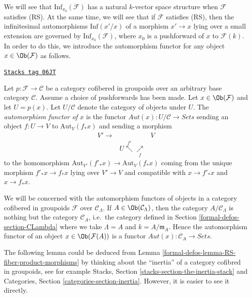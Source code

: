 We will see that $\text{Inf}_{x_0}(\mathcal{F})$ has a natural $k$-vector
space structure when $\mathcal{F}$ satisfies (RS). At the same time, we will
see that if $\mathcal{F}$ satisfies (RS), then the infinitesimal automorphisms
$\text{Inf}(x'/x)$ of a morphism $x' \to x$ lying over a small
extension are governed by $\text{Inf}_{x_0}(\mathcal{F})$, where $x_0$ is
a pushforward of $x$ to $\mathcal{F}(k)$. In order to do this, we introduce
the automorphism functor for any object $x \in \Ob(\mathcal{F})$ as
follows.

\begin{definition}
\label{formal-defos-definition-automorphism-functor}
\href{https://stacks.math.columbia.edu/tag/06JT}{\texttt{Stacks tag 06JT}}

Let $p : \mathcal{F} \to \mathcal{C}$ be a category cofibered in groupoids
over an arbitrary base category $\mathcal{C}$. Assume a choice of pushforwards
has been made. Let $x \in \Ob(\mathcal{F})$ and let $U = p(x)$.
Let $U/\mathcal{C}$ denote the category of objects under $U$. The
{\it automorphism functor of $x$} is the functor
$\mathit{Aut}(x) : U/\mathcal{C} \to \textit{Sets}$ sending an object
$f : U \to V$ to $\text{Aut}_V(f_*x)$ and sending a morphism
$$
\begin{array}{ccc}V' \longrightarrow &  & V \\  & U \overset{f'}{\nwarrow}\underset{f}{\nearrow} & \end{array}
$$
to the homomorphism
$\text{Aut}_{V'}(f'_*x) \to \text{Aut}_V(f_*x)$
coming from the unique morphism $f'_*x \to f_*x$ lying over
$V' \to V$ and compatible with $x \to f'_*x$ and $x \to f_*x$.
\end{definition}

We will be concerned with the automorphism functors of objects in a category
cofibered in groupoids $\mathcal{F}$ over $\mathcal{C}_\Lambda$. If
$A \in \Ob(\mathcal{C}_\Lambda)$, then the category
$A/\mathcal{C}_\Lambda$ is nothing but the category $\mathcal{C}_A$,
i.e.\ the category defined in Section \ref{formal-defos-section-CLambda}
where we take $\Lambda = A$ and $k = A/\mathfrak m_A$.
Hence the automorphism functor of an object
$x \in \Ob(\mathcal{F}(A))$ is a functor
$\mathit{Aut}(x) : \mathcal{C}_A \to \textit{Sets}$.

\medskip\noindent
The following lemma could be deduced from
Lemma \ref{formal-defos-lemma-RS-fiber-product-morphisms}
by thinking about the ``inertia'' of a category cofibred in groupoids,
see for example
Stacks, Section \ref{stacks-section-the-inertia-stack}
and
Categories, Section \ref{categories-section-inertia}.
However, it is easier to see it directly.

